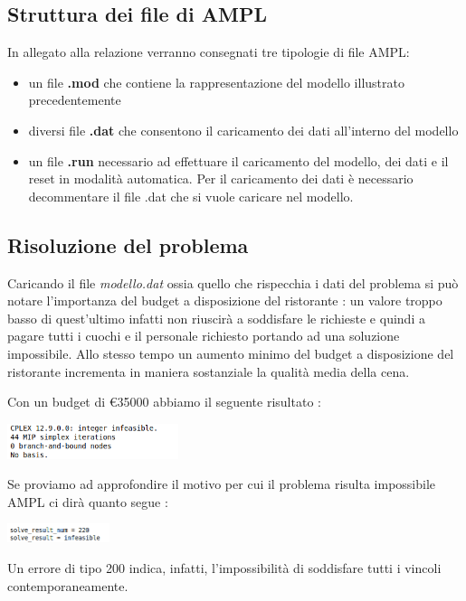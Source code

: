 \documentclass[../modello-progetto.tex]{subfiles}
\begin{document}
\subsection{ Struttura dei file di AMPL}
\label{sub:struttura_dei_file_di_AMPL}

In allegato alla relazione verranno consegnati tre tipologie di file AMPL:
\begin{itemize}
	\item un file \textbf{.mod} che contiene la rappresentazione del modello illustrato precedentemente
	\item diversi file \textbf{.dat} che consentono il caricamento dei dati all'interno del modello
	\item un file \textbf{.run} necessario ad effettuare il caricamento del modello, dei dati e il reset in modalità automatica. Per il caricamento dei dati è necessario decommentare il file .dat che si vuole caricare nel modello.
\end{itemize}

\subsection{Risoluzione del problema}
\label{sub:risoluzione_del_problema}

Caricando il file \textit{modello.dat} ossia quello che rispecchia i dati del problema si può notare l'importanza del budget a disposizione del ristorante : un valore troppo basso di quest'ultimo infatti non riuscirà a soddisfare le richieste e quindi a pagare tutti i cuochi e il personale richiesto portando ad una soluzione impossibile. Allo stesso tempo un aumento minimo del budget a disposizione del ristorante incrementa in maniera sostanziale la qualità media della cena.

Con un budget di €35000 abbiamo il seguente risultato :
\begin{center}
	\includegraphics[width= 5cm]{img/35000-result.png}
\end{center}

Se proviamo ad approfondire il motivo per cui il problema risulta impossibile AMPL ci dirà quanto segue :
\begin{center}
	\includegraphics[width= 3cm]{img/35000-fault.png}
\end{center}
Un errore di tipo 200 indica, infatti, l'impossibilità di soddisfare tutti i vincoli contemporaneamente.
\end{document}
